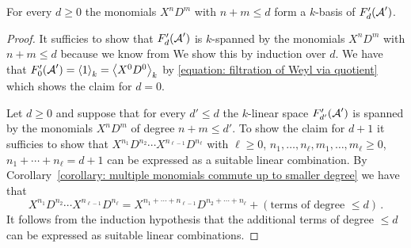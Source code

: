 \begin{corollary}
  \label{corollary: basis of filtration subspaces}
  For every $d \geq 0$ the monomials $X^n D^m$ with $n + m \leq d$ form a $k$-basis of $F'_d(\operatorname{\mathcal{A}}')$.
\end{corollary}


\begin{proof}
  It sufficies to show that $F'_d(\operatorname{\mathcal{A}}')$ is $k$-spanned by the monomials $X^n D^m$ with $n+m \leq d$ because we know from 
  We show this by induction over $d$.
  We have that $F'_0(\operatorname{\mathcal{A}}') = \left\langle 1 \right\rangle_k = \left\langle X^0 D^0 \right\rangle_k$ by \eqref{equation: filtration of Weyl via quotient} which shows the claim for $d = 0$.
  
  Let $d \geq 0$ and suppose that for every $d' \leq d$ the $k$-linear space $F'_{d'}(\operatorname{\mathcal{A}}')$ is spanned by the monomials $X^n D^m$ of degree $n + m \leq d'$.
  To show the claim for $d + 1$ it sufficies to show that $X^{n_1} D^{n_2} \dotsm X^{n_{\ell-1}} D^{n_\ell}$ with $\ell \geq 0$, $n_1, \dotsc, n_\ell, m_1, \dotsc, m_\ell \geq 0$, $n_1 + \dotsb + n_\ell = d+1$ can be expressed as a suitable linear combination.
  By Corollary~\ref{corollary: multiple monomials commute up to smaller degree} we have that
  \[
      X^{n_1} D^{n_2} \dotsm X^{n_{\ell-1}} D^{n_\ell}
    =   X^{n_1 + \dotsb + n_{\ell-1}} D^{n_2 + \dotsb + n_\ell}
      + (\text{terms of degree $\leq d$}) \,.
  \]
  It follows from the induction hypothesis that the additional terms of degree $\leq d$ can be expressed as suitable linear combinations.
\end{proof}


